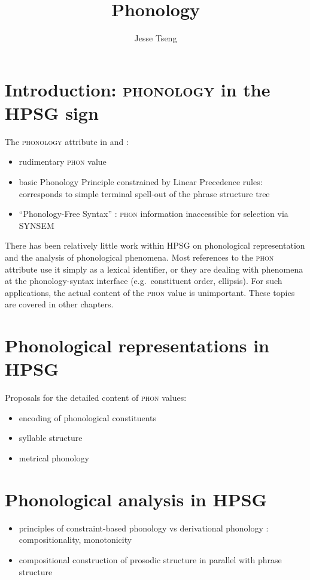 \documentclass[output=paper]{langsci/langscibook}
\author{Jesse Tseng\affiliation{Université Paris Diderot}}
\title{Phonology}
\begin{document}
\section{Introduction: \textsc{phonology} in the HPSG sign} 

The \textsc{phonology} attribute in \citep{ps} and \citep{ps2}: 
\begin{itemize}
\item rudimentary \textsc{phon} value 
\item basic Phonology Principle constrained by Linear Precedence
  rules: corresponds to simple terminal spell-out of the phrase structure tree
\item ``Phonology-Free Syntax'' \citep{MPZ97a-u-platte}: \textsc{phon}
  information inaccessible for selection via SYNSEM
\end{itemize}

There has been relatively little work within HPSG on phonological
representation and the analysis of phonological phenomena. Most
references to the \textsc{phon} attribute use it simply as a lexical
identifier, or they are dealing with phenomena at the phonology-syntax
interface (e.g.\ constituent order, ellipsis). For such applications,
the actual content of the \textsc{phon} value is unimportant. These
topics are covered in other chapters.

\section{Phonological representations in HPSG}

Proposals for the detailed content of \textsc{phon} values:
\begin{itemize}
\item encoding of phonological constituents \citep{BK94b,Klein2000a,Hoehle99a-u}

\item syllable structure \cite{TsengHPSG08}

\item metrical phonology \citep{Klein2000a,BonamiDelais06}
\end{itemize}

\section{Phonological analysis in HPSG}

\begin{itemize}
\item principles of constraint-based phonology vs derivational phonology
\citep{BK94b}: compositionality, monotonicity

\item compositional construction of prosodic structure in parallel
  with phrase structure \citep{Klein2000a}
\end{itemize}
\end{document}
